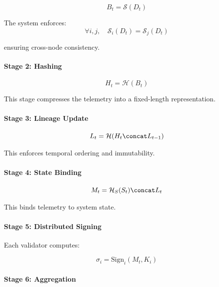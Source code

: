 \begin{equation}
B_t = \mathcal{S}(D_t)
\end{equation}

The system enforces:
\begin{equation}
\forall i,j, \quad \mathcal{S}_i(D_t) = \mathcal{S}_j(D_t)
\end{equation}

ensuring cross-node consistency.

\paragraph{Stage 2: Hashing}

\begin{equation}
H_t = \mathcal{H}(B_t)
\end{equation}

This stage compresses the telemetry into a fixed-length representation.

\paragraph{Stage 3: Lineage Update}

\begin{equation}
L_t = \mathcal{H}(H_t \concat L_{t-1})
\end{equation}

This enforces temporal ordering and immutability.

\paragraph{Stage 4: State Binding}

\begin{equation}
M_t = \mathcal{H}_S(S_t) \concat L_t
\end{equation}

This binds telemetry to system state.

\paragraph{Stage 5: Distributed Signing}

Each validator computes:

\begin{equation}
\sigma_i = \text{Sign}_i(M_t, K_i)
\end{equation}

\paragraph{Stage 6: Aggregation}

